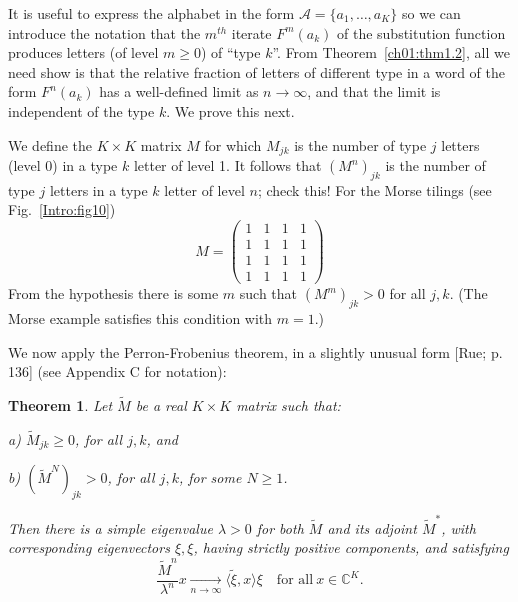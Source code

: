 \documentclass[reqno]{stml-l}
\theoremstyle{plain}
\newtheorem{theorem}{Theorem}[chapter]
\theoremstyle{definition}
\numberwithin{equation}{chapter}
\begin{document}
It is useful to express the alphabet in the form $\mathcal{A}=\{a_{1}, \ldots, a_{K}\}$ so we can introduce the notation that the $m^{th}$ iterate $F^{m}(a_{k})$ of the substitution function produces letters (of level $m\geq 0$) of ``type $k$''. From Theorem~\ref{ch01:thm1.2}, all we need show is that the relative fraction of letters of different type in a word of the form $F^{n}(a_{k})$ has a well-defined limit as $n\rightarrow\infty$, and that the limit is independent of the type $k$. We prove this next.

We define the $K\times K$ matrix $M$ for which $M_{jk}$ is the number of type $j$ letters (level $0$) in a type $k$ letter of level 1. It follows that
$(M^{n})_{jk}$ is the number of type $j$ letters in a type $k$ letter of level $n$; check this! For the Morse tilings (see Fig.~\ref{Intro:fig10})
\begin{equation}
M=\left(\begin{array}{llll}
1 & 1 & 1 & 1\\
1 & 1 & 1 & 1\\
1 & 1 & 1 & 1\\
1 & 1 & 1 & 1
\end{array}\right)\label{ch01:eqn1.15}
\end{equation}
From the hypothesis there is some $m$ such that $(M^{m})_{jk}>0$ for all $j,k$. (The Morse example satisfies this condition with $m=1$.)

We now apply the Perron-Frobenius theorem, in a slightly unusual form [Rue; p. 136] (see Appendix C for notation):

\begin{theorem}\label{ch01:thm1.6}
Let $\tilde{M}$ be a real $K\times K$ matrix such that:

a) $\tilde{M}_{jk}\geq 0$, for all $j,k$, and

b) $(\tilde{M}^{N})_{jk}>0$, for all $j,k$, for some $N\geq 1$.

\noindent Then there is a simple eigenvalue $\lambda>0$ for both $\tilde{M}$ and its adjoint $\tilde{M}^{\ast}$, with corresponding eigenvectors $\xi,\xi$, having strictly positive components, and satisfying
\begin{equation}
\frac{\tilde{M}^{n}}{\lambda^{n}}x \underset{n\rightarrow\infty}{\xrightarrow{\quad}}\langle\tilde{\xi}, x\rangle\xi\quad \mbox{for all}\ x\in \mathbb{C}^{K}.\label{ch01:eqn1.16}
\end{equation}
\end{theorem}
\end{document}
